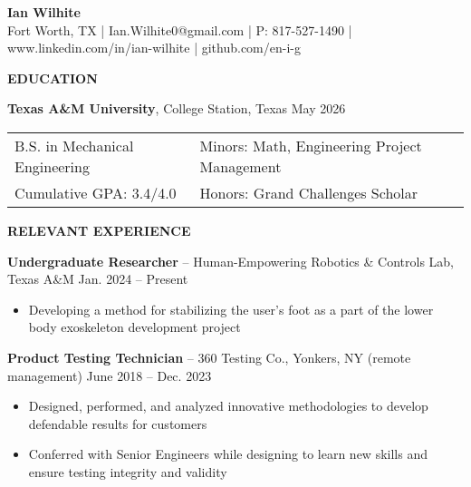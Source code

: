 \documentclass[18pt]{article}
\begin{document}
\begin{center}
    \LARGE \textbf{Ian Wilhite}\\ 
    \small Fort Worth, TX | Ian.Wilhite0@gmail.com | P: 817-527-1490 | www.linkedin.com/in/ian-wilhite | github.com/en-i-g
    
\end{center}

\begin{center}
    \textbf{EDUCATION}
    \hrulefill
\end{center}

\textbf{Texas A\&M University}, College Station, Texas \hfill May 2026

\begin{tabular}{l|l} %
    B.S. in Mechanical Engineering \hspace*{1in} & Minors: Math, Engineering Project Management \\ 
    Cumulative GPA: 3.4/4.0 & Honors: Grand Challenges Scholar\\
\end{tabular}

\vspace{-0.5\baselineskip}
\begin{center}
    \textbf{RELEVANT EXPERIENCE}
    \hrulefill
\end{center}

\vspace{-0.5\baselineskip}
\textbf{Undergraduate Researcher} – Human-Empowering Robotics \& Controls Lab, Texas A\&M \hfill Jan. 2024 – Present

\begin{itemize}[noitemsep]
    \vspace{-0.75\baselineskip}
    \item Developing a method for stabilizing the user’s foot as a part of the lower body exoskeleton development project
\end{itemize}

\vspace{-0.5\baselineskip}
\textbf{Product Testing Technician} – 360 Testing Co., Yonkers, NY (remote management) \hfill June 2018 – Dec. 2023

\begin{itemize}[noitemsep]
    \vspace{-0.75\baselineskip}
    \item Designed, performed, and analyzed innovative methodologies to develop defendable results for customers
    \item Conferred with Senior Engineers while designing to learn new skills and ensure testing integrity and validity
\end{itemize}
\end{document}
